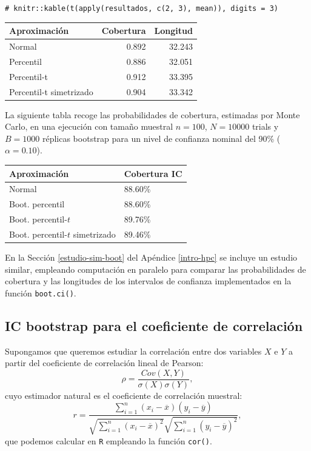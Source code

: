 \documentclass[
]{book}
\newenvironment{Shaded}{\begin{snugshade}}{\end{snugshade}}
\newcommand{\CommentTok}[1]{\textcolor[rgb]{0.56,0.35,0.01}{\textit{#1}}}
\newcounter{none} %
\theoremstyle{break}
\theoremstyle{nonumberplain}
\renewcommand{\CommentTok}[1]{\textcolor[rgb]{0.41,0.41,0.41}{\texttt{#1}}}
\begin{document}
\begin{Shaded}
\begin{Highlighting}[]
\CommentTok{\# knitr::kable(t(apply(resultados, c(2, 3), mean)), digits = 3)}
\end{Highlighting}
\end{Shaded}

{\def\LTcaptype{none} %
\begin{longtable}[]{@{}lrr@{}}
\toprule\noalign{}
Aproximación & Cobertura & Longitud \\
\midrule\noalign{}
\endhead
\bottomrule\noalign{}
\endlastfoot
Normal & 0.892 & 32.243 \\
Percentil & 0.886 & 32.051 \\
Percentil-t & 0.912 & 33.395 \\
Percentil-t simetrizado & 0.904 & 33.342 \\
\end{longtable}
}

La siguiente tabla recoge las probabilidades de cobertura, estimadas por
Monte Carlo, en una ejecución con tamaño muestral \(n=100\), \(N=10000\)
trials y \(B=1000\) réplicas bootstrap para un nivel de confianza nominal
del 90\% (\(\alpha =0.10\)).

{\def\LTcaptype{none} %
\begin{longtable}[]{@{}ll@{}}
\toprule\noalign{}
Aproximación & Cobertura IC \\
\midrule\noalign{}
\endhead
\bottomrule\noalign{}
\endlastfoot
Normal & 88.60\% \\
Boot. percentil & 88.60\% \\
Boot. percentil-\(t\) & 89.76\% \\
Boot. percentil-\(t\) simetrizado & 89.46\% \\
\end{longtable}
}

En la Sección \ref{estudio-sim-boot} del Apéndice \ref{intro-hpc} se incluye un estudio similar, empleando computación en paralelo para comparar las probabilidades de cobertura y las longitudes de los intervalos de confianza implementados en la función \texttt{boot.ci()}.

\subsection{IC bootstrap para el coeficiente de correlación}\label{icboot-trans}

Supongamos que queremos estudiar la correlación entre dos variables \(X\) e \(Y\) a partir del coeficiente de correlación lineal de Pearson:
\[\rho =\frac{ Cov \left( X, Y \right) }
{ \sigma \left( X \right) \sigma \left( Y \right) },\]
cuyo estimador natural es el coeficiente de correlación muestral:
\[r=\frac{\sum_{i=1}^{n}(x_i-\overline{x})(y_i-\overline{y})}
{\sqrt{ \sum_{i=1}^{n}(x_i-\overline{x})^{2}} 
\sqrt{\sum_{i=1}^{n}(y_i-\overline{y})^{2}}},\]
que podemos calcular en \texttt{R} empleando la función \texttt{cor()}.
\end{document}
